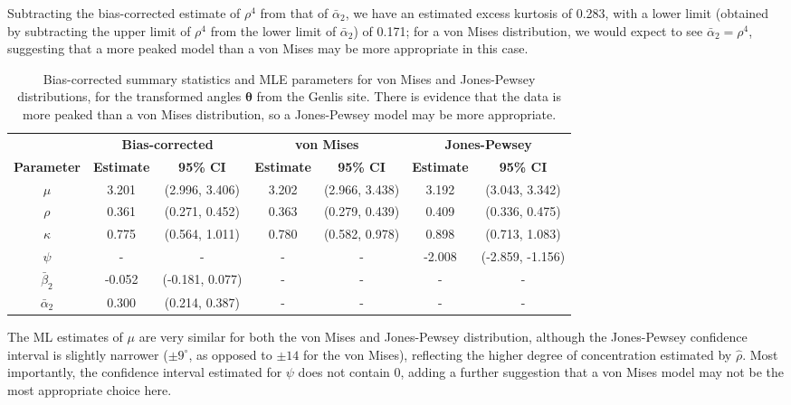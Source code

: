 \documentclass[../../ArchStats.tex]{subfiles}
\begin{document}
Subtracting the bias-corrected estimate of $\rho^4$ from that of $\bar{\alpha}_2$, we have an estimated excess kurtosis of 0.283, with a lower limit (obtained by subtracting the upper limit of $\rho^4$ from the lower limit of $\bar{\alpha}_2$) of 0.171; for a von Mises distribution, we would expect to see $\bar{\alpha}_2 = \rho^4$, suggesting that a more peaked model than a von Mises may be more appropriate in this case.

\begin{table}[!ht]
\footnotesize
\centering
\caption{Bias-corrected summary statistics and MLE parameters for von Mises and Jones-Pewsey distributions, for the transformed angles $\boldsymbol{\theta}$ from the Genlis site. There is evidence that the data is more peaked than a von Mises distribution, so a Jones-Pewsey model may be more appropriate.}
\label{tab:Genlis-statistics}
\begin{tabular}{c|cc|cc|cc}
\hline 
 & \multicolumn{2}{c|}{\textbf{Bias-corrected}} & \multicolumn{2}{c|}{\textbf{von Mises}} & \multicolumn{2}{c}{\textbf{Jones-Pewsey}} \\
\textbf{Parameter} & \textbf{Estimate} & \textbf{95\% CI} & \textbf{Estimate} & \textbf{95\% CI} & \textbf{Estimate} & \textbf{95\% CI} \\
\hline
$\mu$ & 3.201 & (2.996, 3.406) & 3.202 & (2.966, 3.438) & 3.192 & (3.043, 3.342) \\ 
$\rho$ & 0.361 & (0.271, 0.452) & 0.363 & (0.279, 0.439) & 0.409 & (0.336, 0.475) \\ 
$\kappa$ & 0.775 & (0.564, 1.011) & 0.780 & (0.582, 0.978) & 0.898 & (0.713, 1.083) \\ 
$\psi$ & - & - & - & - & -2.008 & (-2.859, -1.156) \\ 
$\bar{\beta}_2$ & -0.052 & (-0.181, 0.077) & - & - & - & - \\ 
$\bar{\alpha}_2 $ & 0.300 & (0.214, 0.387) & - & - & - & - \\ 
\hline
\end{tabular}
\end{table}


The ML estimates of $\mu$ are very similar for both the von Mises and Jones-Pewsey distribution, although the Jones-Pewsey confidence interval is slightly narrower ($\pm 9^\circ$, as opposed to $\pm 14$ for the von Mises), reflecting the higher degree of concentration estimated by $\hat{\rho}$. Most importantly, the confidence interval estimated for $\psi$ does not contain 0, adding a further suggestion that a von Mises model may not be the most appropriate choice here.
\end{document}
